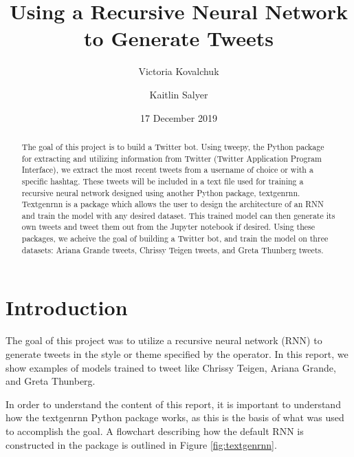 \documentclass[%
 reprint,
 amsmath,amssymb,
 aps,
]{revtex4-2}
\begin{document}

\title{Using a Recursive Neural Network to Generate Tweets}%

\author{Victoria Kovalchuk}
\author{Kaitlin Salyer}%
%

\date{17 December 2019}

\begin{abstract}
The goal of this project is to build a Twitter bot. Using tweepy, the Python package for extracting and utilizing information from Twitter (Twitter Application Program Interface), we extract the most recent tweets from a username of choice or with a specific hashtag. These tweets will be included in a text file used for training a recursive neural network designed using another Python package, textgenrnn. Textgenrnn is a package which allows the user to design the architecture of an RNN and train the model with any desired dataset. This trained model can then generate its own tweets and tweet them out from the Jupyter notebook if desired. Using these packages, we acheive the goal of building a Twitter bot, and train the model on three datasets: Ariana Grande tweets, Chrissy Teigen tweets, and Greta Thunberg tweets.
\end{abstract}

\maketitle


\section{Introduction}

The goal of this project was to utilize a recursive neural network (RNN) to generate tweets in the style or theme specified by the operator. In this report, we show examples of models trained to tweet like Chrissy Teigen, Ariana Grande, and Greta Thunberg.

In order to understand the content of this report, it is important to understand how the textgenrnn Python package works, as this is the basis of what was used to accomplish the goal. A flowchart describing how the default RNN is constructed in the package is outlined in Figure \ref{fig:textgenrnn}.
\end{document}
